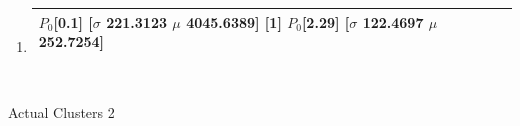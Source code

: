 \begin{center}
\begin{enumerate}
\item \begin{tabular}{ | p{15cm} | }\hline 
            [0] $P_0$[0.1]	[$\sigma$ 221.3123	$\mu$ 4045.6389]
            [1] $P_0$[2.29]	[$\sigma$ 122.4697	$\mu$ 252.7254]
\\ \hline 
\end{tabular}\\ \vspace{3mm}

\end{enumerate} 
 \end{center}
            Actual Clusters 2
